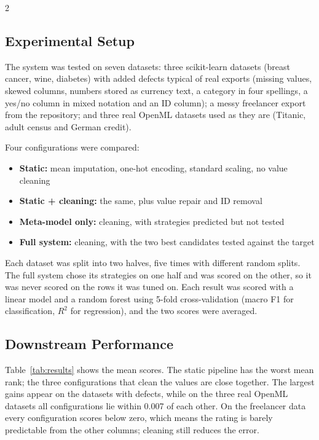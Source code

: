 \documentclass[11pt,a4paper]{article}
\begin{document}
\begin{multicols}{2}
\subsection{Experimental Setup}

The system was tested on seven datasets: three scikit-learn datasets (breast cancer, wine, diabetes) with added defects typical of real exports (missing values, skewed columns, numbers stored as currency text, a category in four spellings, a yes/no column in mixed notation and an ID column); a messy freelancer export from the repository; and three real OpenML datasets used as they are (Titanic, adult census and German credit).

Four configurations were compared:
\begin{itemize}[leftmargin=*, noitemsep]
    \item \textbf{Static:} mean imputation, one-hot encoding, standard scaling, no value cleaning
    \item \textbf{Static + cleaning:} the same, plus value repair and ID removal
    \item \textbf{Meta-model only:} cleaning, with strategies predicted but not tested
    \item \textbf{Full system:} cleaning, with the two best candidates tested against the target
\end{itemize}

Each dataset was split into two halves, five times with different random splits. The full system chose its strategies on one half and was scored on the other, so it was never scored on the rows it was tuned on. Each result was scored with a linear model and a random forest using 5-fold cross-validation (macro F1 for classification, $R^2$ for regression), and the two scores were averaged.

\subsection{Downstream Performance}

Table~\ref{tab:results} shows the mean scores. The static pipeline has the worst mean rank; the three configurations that clean the values are close together. The largest gains appear on the datasets with defects, while on the three real OpenML datasets all configurations lie within 0.007 of each other. On the freelancer data every configuration scores below zero, which means the rating is barely predictable from the other columns; cleaning still reduces the error.


\end{multicols}
\end{document}
